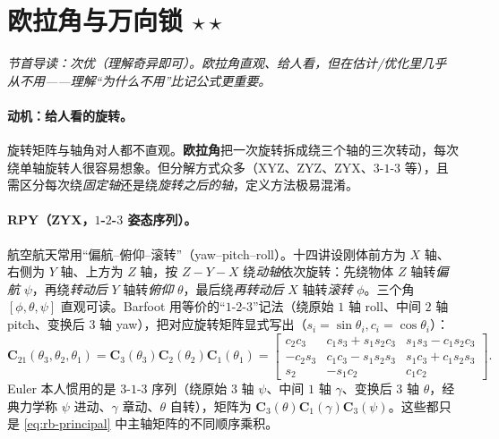 \section{欧拉角与万向锁 \texorpdfstring{$\star\star$}{**}}
\label{sec:rb-euler}
\noindent\emph{节首导读：次优（理解奇异即可）。欧拉角直观、给人看，但在估计/优化里几乎从不用——理解“为什么不用”比记公式更重要。}

\paragraph{动机：给人看的旋转。}旋转矩阵与轴角对人都不直观。\textbf{欧拉角}把一次旋转拆成绕三个轴的三次转动，每次绕单轴旋转人很容易想象\cite{gaoxiang2019slam14}。但分解方式众多（XYZ、ZYZ、ZYX、$3$-$1$-$3$ 等），且需区分每次绕\emph{固定轴}还是绕\emph{旋转之后的轴}，定义方法极易混淆。

\paragraph{RPY（ZYX，$1$-$2$-$3$ 姿态序列）。}航空航天常用“偏航--俯仰--滚转”（yaw--pitch--roll）。十四讲设刚体前方为 $X$ 轴、右侧为 $Y$ 轴、上方为 $Z$ 轴，按 $Z\!-\!Y\!-\!X$ 绕\emph{动轴}依次旋转：先绕物体 $Z$ 轴转\emph{偏航} $\psi$，再绕\emph{转动后} $Y$ 轴转\emph{俯仰} $\theta$，最后绕\emph{再转动后} $X$ 轴转\emph{滚转} $\phi$。三个角 $[\phi,\theta,\psi]$ 直观可读。Barfoot 用等价的“$1$-$2$-$3$”记法（绕原始 $1$ 轴 roll、中间 $2$ 轴 pitch、变换后 $3$ 轴 yaw），把对应旋转矩阵显式写出\cite{barfoot2024state}（$s_i=\sin\theta_i,c_i=\cos\theta_i$）：
\begin{equation}
  \mathbf{C}_{21}(\theta_3,\theta_2,\theta_1)=\mathbf{C}_3(\theta_3)\mathbf{C}_2(\theta_2)\mathbf{C}_1(\theta_1)
  =\begin{bmatrix}
  c_2c_3 & c_1s_3+s_1s_2c_3 & s_1s_3-c_1s_2c_3\\
  -c_2s_3 & c_1c_3-s_1s_2s_3 & s_1c_3+c_1s_2s_3\\
  s_2 & -s_1c_2 & c_1c_2
  \end{bmatrix}.
  \label{eq:rb-euler123}
\end{equation}
Euler 本人惯用的是 $3$-$1$-$3$ 序列（绕原始 $3$ 轴 $\psi$、中间 $1$ 轴 $\gamma$、变换后 $3$ 轴 $\theta$，经典力学称 $\psi$ 进动、$\gamma$ 章动、$\theta$ 自转），矩阵为 $\mathbf{C}_3(\theta)\mathbf{C}_1(\gamma)\mathbf{C}_3(\psi)$。这些都只是 \cref{eq:rb-principal} 中主轴矩阵的不同顺序乘积。

